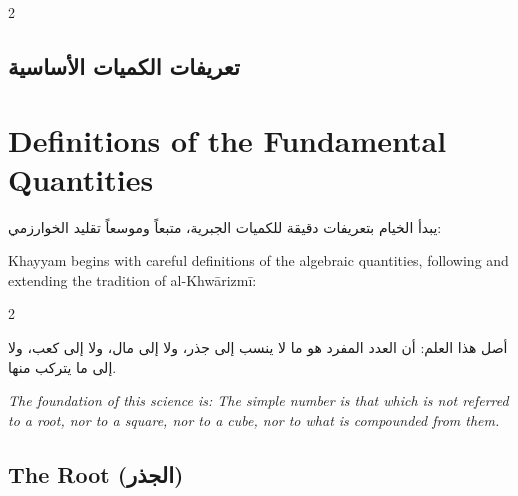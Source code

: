 \documentclass[11pt,a4paper]{book}
\begin{document}
\begin{paracol}{2}

\begin{Arabic}
\section*{تعريفات الكميات الأساسية}
\end{Arabic}

\switchcolumn

\section*{Definitions of the Fundamental Quantities}

\switchcolumn*

\begin{Arabic}
يبدأ الخيام بتعريفات دقيقة للكميات الجبرية، متبعاً وموسعاً تقليد الخوارزمي:
\end{Arabic}

\switchcolumn

Khayyam begins with careful definitions of the algebraic quantities, following and extending the tradition of al-Khwārizmī:

\end{paracol}

\begin{definitionbar}
\begin{paracol}{2}
\begin{Arabic}
أصل هذا العلم: أن العدد المفرد هو ما لا ينسب إلى جذر، ولا إلى مال، ولا إلى كعب، ولا إلى ما يتركب منها.
\end{Arabic}
\switchcolumn
\textit{The foundation of this science is: The simple number is that which is not referred to a root, nor to a square, nor to a cube, nor to what is compounded from them.}
\end{paracol}
\end{definitionbar}

\subsection{The Root (\textarabic{الجذر})}
\label{subsec:root}
\end{document}
